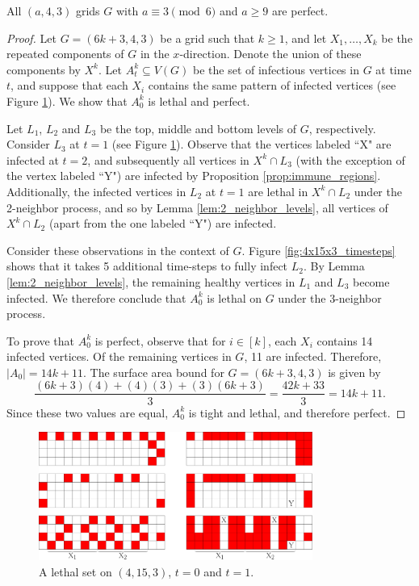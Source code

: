 \begin{con}
\label{con:3x4xa}
All $(a,4,3)$ grids $G$ with $a \equiv 3 \pmod 6$ and $a \geq 9$ are perfect. 
\end{con}

\begin{proof}
Let $G=(6k+3,4,3)$ be a grid such that $k \geq 1$, and let $X_1, \dots, X_{k}$ be the repeated components of $G$ in the $x$-direction. Denote the union of these components by $X^k$. Let $A_t^k \subseteq V(G)$ be the set of infectious vertices in $G$ at time $t$, and suppose that each $X_i$ contains the same pattern of infected vertices (see Figure \ref{fig:4x15x3}). We show that $A_0^k$ is lethal and perfect. 

Let $L_1$, $L_2$ and $L_3$ be the top, middle and bottom levels of $G$, respectively. Consider $L_3$ at $t=1$ (see Figure \ref{fig:4x15x3}). Observe that the vertices labeled ``X" are infected at $t=2$, and subsequently all vertices in $X^k \cap L_3$ (with the exception of the vertex labeled ``Y") are infected by Proposition \ref{prop:immune_regions}. Additionally, the infected vertices in $L_2$ at $t=1$ are lethal in $X^k \cap L_2$ under the 2-neighbor process, and so by Lemma \ref{lem:2_neighbor_levels}, all vertices of $X^k \cap L_2$ (apart from the one labeled ``Y") are infected.

Consider these observations in the context of $G$. Figure \ref{fig:4x15x3_timesteps} shows that it takes 5 additional time-steps to fully infect $L_2$. By Lemma \ref{lem:2_neighbor_levels}, the remaining healthy vertices in $L_1$ and $L_3$ become infected. We therefore conclude that $A_0^k$ is lethal on $G$ under the 3-neighbor process.

To prove that $A_0^k$ is perfect, observe that for $i \in [k]$, each $X_i$ contains 14 infected vertices. Of the remaining vertices in $G$, 11 are infected. Therefore, $|A_0| = 14k+11$. The surface area bound for $G=(6k+3,4,3)$ is given by
$$\frac{(6k+3)(4) + (4)(3) + (3)(6k+3)}{3} = \frac{42k + 33}{3} = 14k+11.$$
Since these two values are equal, $A_0^k$ is tight and lethal, and therefore perfect.
\end{proof}

\begin{figure}[]
\centering
\includegraphics[width=0.8\textwidth]{figures/7/4x15x3.pdf}
\caption{A lethal set on $(4,15,3)$, $t=0$ and $t=1$.}
\label{fig:4x15x3}
\end{figure}

